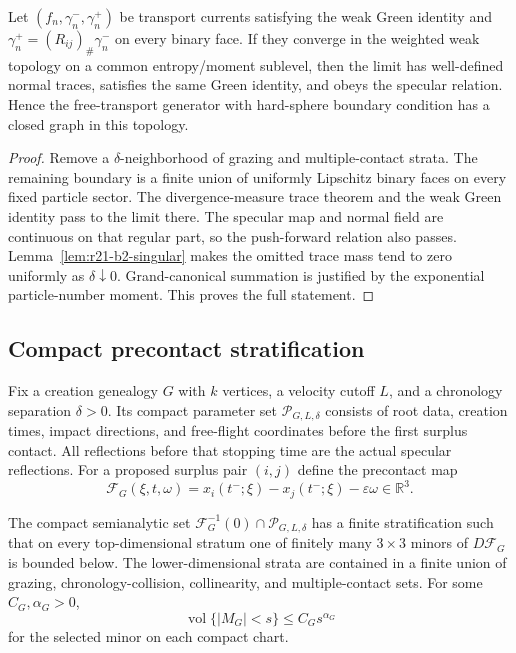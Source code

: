 \begin{theorem}
\label{thm:r21-b2-trace}
Let $(f_n,\gamma_n^-,\gamma_n^+)$ be transport currents satisfying the weak
Green identity and
$\gamma_n^+=(R_{ij})_\#\gamma_n^-$ on every binary face.  If they converge in
the weighted weak topology on a common entropy/moment sublevel, then the limit
has well-defined normal traces, satisfies the same Green identity, and obeys
the specular relation.  Hence the free-transport generator with hard-sphere
boundary condition has a closed graph in this topology.
\end{theorem}

\begin{proof}
Remove a $\delta$-neighborhood of grazing and multiple-contact strata.  The
remaining boundary is a finite union of uniformly Lipschitz binary faces on
every fixed particle sector.  The divergence-measure trace theorem and the
weak Green identity pass to the limit there.  The specular map and normal
field are continuous on that regular part, so the push-forward relation also
passes.  Lemma~\ref{lem:r21-b2-singular} makes the omitted trace mass tend to
zero uniformly as $\delta\downarrow0$.  Grand-canonical summation is justified
by the exponential particle-number moment.  This proves the full statement.
\end{proof}

\subsection{Compact precontact stratification}

Fix a creation genealogy $G$ with $k$ vertices, a velocity cutoff $L$, and a
chronology separation $\delta>0$.  Its compact parameter set
$\mathcal P_{G,L,\delta}$ consists of root data, creation times, impact
directions, and free-flight coordinates before the first surplus contact.
All reflections before that stopping time are the actual specular
reflections.  For a proposed surplus pair $(i,j)$ define the precontact map
\[
 \mathcal F_G(\xi,t,\omega)=x_i(t^-;\xi)-x_j(t^-;\xi)-\varepsilon\omega
 \in\mathbb R^3.
\]

\begin{theorem}
\label{thm:r21-b2-atlas}
The compact semianalytic set
$\mathcal F_G^{-1}(0)\cap\mathcal P_{G,L,\delta}$ has a finite stratification
such that on every top-dimensional stratum one of finitely many $3\times3$
minors of $D\mathcal F_G$ is bounded below.  The lower-dimensional strata are
contained in a finite union of grazing, chronology-collision, collinearity,
and multiple-contact sets.  For some $C_G,\alpha_G>0$,
\[
 \operatorname{vol}\{|M_G|<s\}\le C_Gs^{\alpha_G}
\]
for the selected minor on each compact chart.
\end{theorem}

